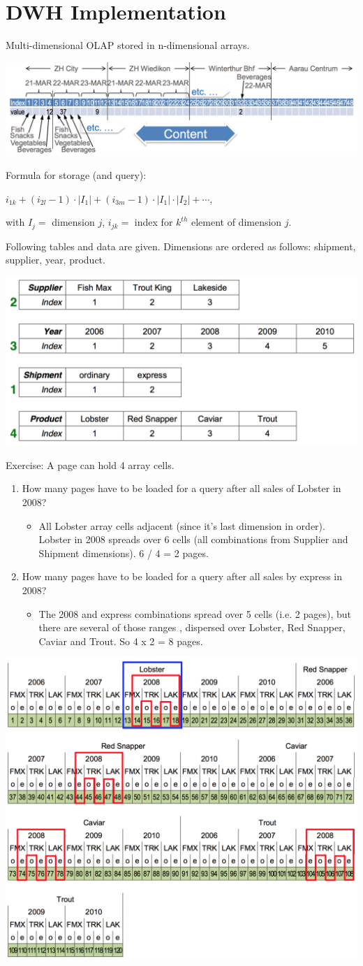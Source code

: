 
\section{DWH Implementation}

\begin{breakbox}
\newline Multi-dimensional OLAP stored in n-dimensional arrays.
\begin{center}
\includegraphics[width=.15\textwidth]{slides_images/molap}
\end{center}
Formula for storage (and query):
\begin{center}
$i_{1k} + (i_{2l}-1) \cdot |I_1| + (i_{3m}-1) \cdot |I_1| \cdot |I_2| + \cdots$,
\end{center}
with $I_j =$ dimension $j$, $i_{jk} =$ index for $k^{th}$ element of dimension $j$.
\end{breakbox}

\begin{breakbox}
\newline Following tables and data are given. Dimensions are ordered as follows: shipment, supplier, year, product.
\begin{center}
\includegraphics[width=.15\textwidth]{slides_images/molap_example}
\end{center}
Exercise: A page can hold 4 array cells.
\begin{enumerate}[label=(\alph*)]
	\item How many pages have to be loaded for a query after all sales of Lobster in 2008?
		\begin{itemize}
			\item[] All Lobster array cells adjacent (since it's last dimension in order). Lobster in 2008 spreads over 6 cells (all combinations from Supplier and Shipment dimensions). 6 / 4 = 2 pages.
		\end{itemize}
	\item How many pages have to be loaded for a query after all sales by express in 2008?
		\begin{itemize}
			\item[] The 2008 and express combinations spread over 5 cells (i.e. 2 pages), but there are several of those ranges , dispersed over Lobster, Red Snapper, Caviar and Trout. So 4 x 2 = 8 pages.
		\end{itemize}
\end{enumerate}
\begin{center}
\includegraphics[width=.15\textwidth]{slides_images/molap_solution}
\end{center}
\end{breakbox}

